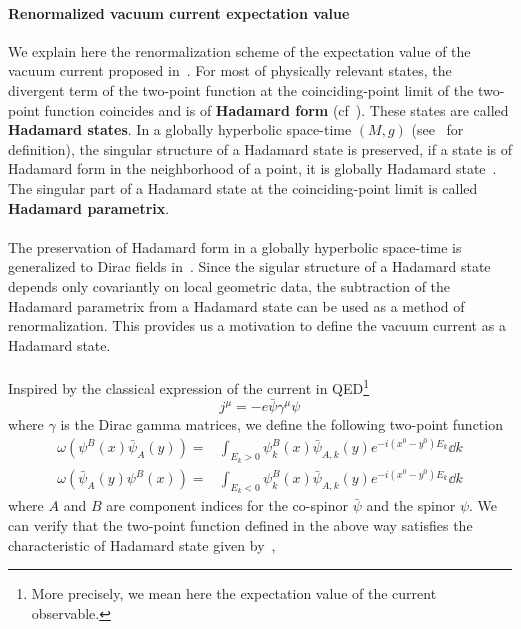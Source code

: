 \paragraph{Renormalized vacuum current expectation value}
We explain here the renormalization scheme of the expectation value of the vacuum current proposed in~\cite{Zahn2015}.
For most of physically relevant states, the divergent term of the two-point function at the coinciding-point limit of the two-point function coincides and is of \textbf{Hadamard form} (cf~\cite{Hollands2014}).
These states are called \textbf{Hadamard states}.
In a globally hyperbolic space-time $(M,g)$ (see~\cite{Wald2010} for definition), 
the singular structure of a Hadamard state is preserved, 
\ie if a state is of Hadamard form in the neighborhood of a point, it is globally Hadamard state~\cite{Fulling1978}.
The singular part of a Hadamard state at the coinciding-point limit is called \textbf{Hadamard parametrix}.  \\\\
%
The preservation of Hadamard form in a globally hyperbolic space-time is generalized to Dirac fields in~\cite{Sahlmann2000}.
Since the sigular structure of a Hadamard state depends only covariantly on local geometric data, the subtraction of the Hadamard parametrix from a Hadamard state can be used as a method of renormalization.
This provides us a motivation to define the vacuum current as a Hadamard state.
\\\\
Inspired by the classical expression of the current in QED\footnote{
More precisely, we mean here the expectation value of the current observable.
}
\begin{equation*}
j^\mu = -e\bar{\psi}\gamma^\mu\psi
\end{equation*}
where $\gamma$ is the Dirac gamma matrices,
we define the following two-point function
\begin{equation}\label{vacuum-hadamardstate}
\begin{split}
\omega(\psi^B(x)\bar{\psi}_A(y)) = & \int_{E_k >0} \psi_k^B(x)\bar{\psi}_{A,k}(y)e^{-i(x^0-y^0)E_k} \dd k \\
\omega(\bar{\psi}_A(y)\psi^B(x)) = & \int_{E_k <0} \psi_k^B(x)\bar{\psi}_{A,k}(y)e^{-i(x^0-y^0)E_k} \dd k 
\end{split}
\end{equation}
where $A$ and $B$ are component indices for the co-spinor $\bar{\psi}$ and the spinor $\psi$.
We can verify that the two-point function defined in the above way satisfies the characteristic of Hadamard state given by~\cite{Radzikowski1996}, \ie
